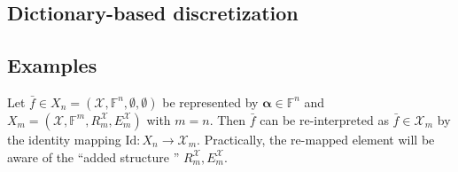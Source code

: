 \documentclass[a4paper]{paper}
\newcommand*{\SPC}[1]{{\ensuremath{\mathscr{#1}}}}
\newcommand*{\SPCX}{\SPC{X}}
\newcommand*{\FIELD}{{\ensuremath{\mathbb{F}}}}
\newcommand*{\Fn}{{\ensuremath{\FIELD^n}}}
\newcommand*{\Fm}{{\ensuremath{\FIELD^m}}}
\newcommand*{\OP}[1]{{\ensuremath{\mathcal{#1}}}}
\newcommand*{\OPID}{\OP{\mathrm{Id}}}
\newcommand*{\EXT}[2]{\ensuremath{E_{#1}^{#2}}}
\newcommand*{\REST}[2]{\ensuremath{R_{#1}^{#2}}}
\newcommand*{\RmX}{{\ensuremath{\REST{m}{\SPC{X}}}}}
\newcommand*{\EmX}{{\ensuremath{\EXT{m}{\SPC{X}}}}}
\newcommand*{\BDalpha}{\boldsymbol{\alpha}}
\begin{document}
\subsection{Dictionary-based discretization}
\label{subsec:soft:dict}




\subsection{Examples}
\label{subsec:soft:examp}

\begin{example}[Re-interpretation]
 Let $\bar f \in X_n = (\SPCX, \Fn, \emptyset, \emptyset)$ be represented by $\BDalpha \in \Fn$ and 
 $X_m = (\SPCX, \Fm, \RmX, \EmX)$ with $m=n$. Then $\bar f$ can be re-interpreted as $\bar f \in \SPCX_m$ by 
 the identity mapping $\OPID \colon X_n \to \SPCX_m$. Practically, the re-mapped element will be aware of the ``added 
 structure '' $\RmX, \EmX$.
\end{example}
\end{document}
